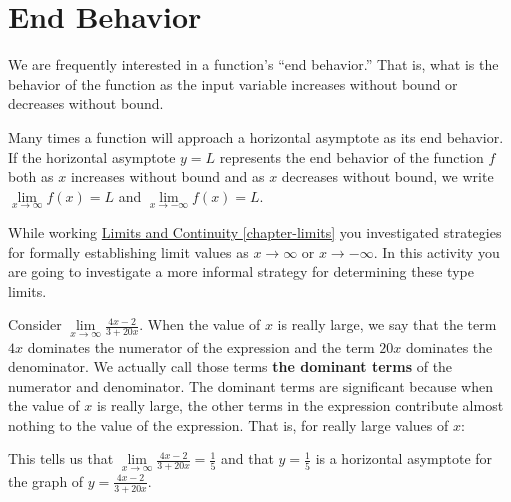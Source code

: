 \documentclass[10pt,oneside,]{book}
\newcommand{\terminology}[1]{\textbf{#1}}
\theoremstyle{plain}
\theoremstyle{definition}
\numberwithin{equation}{section}
\newcounter{figstack}
\newcounter{figindex}
\newlength\fight
\newcommand\pushValignCaptionBottom[5][b]{%
\stepcounter{figstack}%
\expandafter\def\csname %
figalign\romannumeral\value{figstack}\endcsname{#1}%
\expandafter\def\csname %
figtype\romannumeral\value{figstack}\endcsname{#2}%
\expandafter\def\csname %
figwd\romannumeral\value{figstack}\endcsname{#3}%
\expandafter\def\csname %
figcontent\romannumeral\value{figstack}\endcsname{#4}%
\expandafter\def\csname %
figcap\romannumeral\value{figstack}\endcsname{#5}%
\setbox0=\hbox{%
\begin{#2}{#3}#4\end{#2}}%
\ifdim\dimexpr\ht0+\dp0\relax>\fight\global\setlength{\fight}{%
\dimexpr\ht0+\dp0\relax}\fi%
}
\newcommand\popValignCaptionBottom{%
\setcounter{figindex}{0}%
\hfill%
\whiledo{\value{figindex}<\value{figstack}}{%
\stepcounter{figindex}%
\def\tmp{\csname figwd\romannumeral\value{figindex}\endcsname}%
\begin{\csname figtype\romannumeral\value{figindex}\endcsname}[t]{\tmp}%
\centering%
\stackinset{c}{}%
{\csname figalign\romannumeral\value{figindex}\endcsname}{}%
{\csname figcontent\romannumeral\value{figindex}\endcsname}%
{\rule{0pt}{\fight}}\par%
\csname figcap\romannumeral\value{figindex}\endcsname%
\end{\csname figtype\romannumeral\value{figindex}\endcsname}%
\hfill%
}%
\setcounter{figstack}{0}%
\setlength{\fight}{0pt}%
\hfill%
}
\newcommand{\fe}[2]{#1\mathopen{}\left(#2\right)\mathclose{}}
\begin{document}
\section[End Behavior]{End Behavior}\label{section-end-behavior}
We are frequently interested in a function's ``end behavior.''  That is, what is the behavior of the function as the input variable increases without bound or decreases without bound.%
\par
Many times a function will approach a horizontal asymptote as its end behavior.  If the horizontal asymptote \(y=L\) represents the end behavior of the function \(f\) both as \(x\) increases without bound and as \(x\) decreases without bound, we write \(\lim\limits_{x\to\infty}\fe{f}{x}=L\) and \(\lim\limits_{x\to-\infty}\fe{f}{x}=L\).%
\par
While working \hyperref[chapter-limits]{Limits and Continuity \ref{chapter-limits}} you investigated strategies for formally establishing limit values as \(x\to\infty\) or \(x\to-\infty\).  In this activity you are going to investigate a more informal strategy for determining these type limits.%
\par
Consider \(\lim\limits_{x\to\infty}\frac{4x-2}{3+20x}\). When the value of \(x\) is really large, we say that the term \(4x\) dominates the numerator of the expression and the term \(20x\) dominates the denominator. We actually call those terms \terminology{the dominant terms} of the numerator and denominator.  The dominant terms are significant because when the value of \(x\) is really large, the other terms in the expression contribute almost nothing to the value of the expression.   That is, for really large values of \(x\):%
\par
This tells us that \(\lim\limits_{x\to\infty}\frac{4x-2}{3+20x}=\frac{1}{5}\) and that \(y=\frac{1}{5}\) is a horizontal asymptote for the graph of \(y=\frac{4x-2}{3+20x}\).%
\typeout{************************************************}
\typeout{************************************************}
\end{document}
